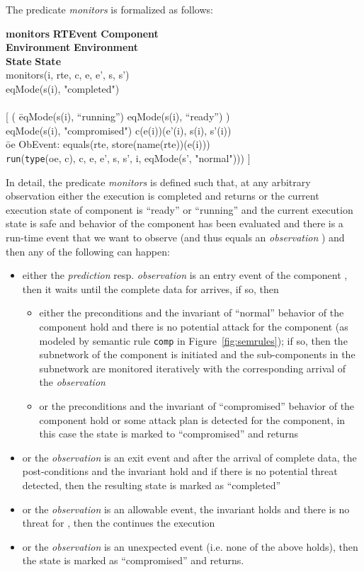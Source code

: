 \documentclass[conference]{IEEEtran}
\begin{document}
The predicate \emph{monitors} is formalized as follows:
\begin{tabbing}
\textbf{monitors}    \= \textbf{RTEvent}  \textbf{Component} \\\> \textbf{Environment}  \textbf{Environment}
\\\> \textbf{State}  \textbf{State}
\\monitors(i, \textlbrackdbl rte\textrbrackdbl, \textlbrackdbl c\textrbrackdbl, e, e', s, s') 
\\ eqMode(s(i), "completed")
\\ 
\\ {[} ( \=eqMode(s(i), ``running'')   eqMode(s(i), ``ready'') )   
\\\> eqMode(s(i), "compromised")  \textlbrackdbl c\textrbrackdbl(e(i))(e'(i), s(i), s'(i)) 
\\\>  \=oe  ObEvent: equals(rte, store(\textlbrackdbl name(rte)\textrbrackdbl)(e(i)))  
\\\>\> {\tt run}({\tt type}(oe, c), c, e, e', s, s', i, eqMode(s', "normal"))) {]}
\end{tabbing}
In detail, the predicate \emph{monitors} is defined such that, at any arbitrary observation either the execution is completed and returns or the current execution state  of component  is ``ready'' or ``running'' and the current execution state is safe and behavior of the component  has been evaluated and there is a run-time event  that we want to observe (and thus equals an \emph{observation} ) and then any of the following
can happen:
\begin{itemize}
\item either the \emph{prediction} resp. \emph{observation} is an entry event of the component , then it waits until the complete data for  arrives, if so, then
\begin{itemize}
\item either the preconditions and the invariant of ``normal'' behavior of the component hold and there is no potential attack for the component (as modeled by semantic rule {\tt comp} in Figure~\ref{fig:semrules}); if so, then the subnetwork of the component is initiated and the sub-components in the subnetwork are monitored iteratively with the corresponding arrival of the \emph{observation}
\item or the preconditions and the invariant of ``compromised''  behavior of the component hold or some attack plan is detected for the component, in this case the state is marked to ``compromised'' and returns
\end{itemize}
\item or the \emph{observation} is an exit event and after the arrival of complete data, the post-conditions and the invariant hold and if there is no potential threat detected, then the resulting state is marked as ``completed''
\item or the \emph{observation} is an allowable event, the invariant holds and there is no threat for , then the  continues the execution
\item or the \emph{observation} is an unexpected event (i.e. none of the above holds), then the state is marked as ``compromised'' and returns.
\end{itemize}
\end{document}
